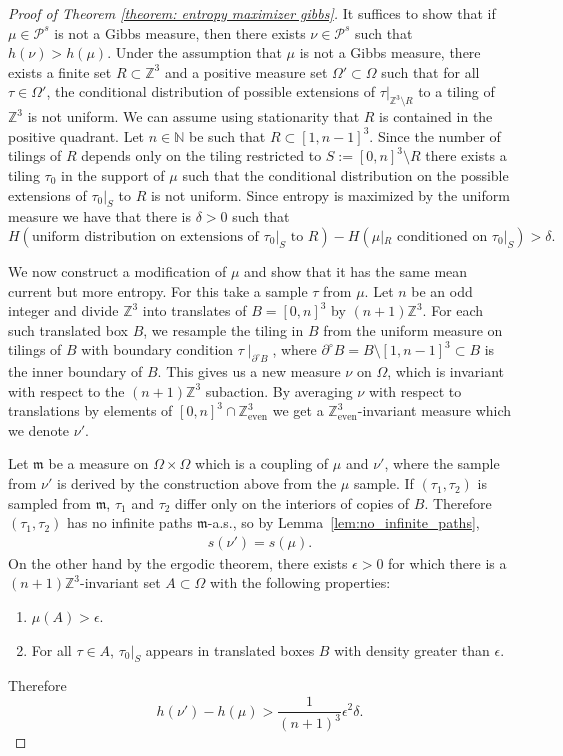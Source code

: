 \documentclass[11pt]{article}
\theoremstyle{remark}
\theoremstyle{definition}
\newcommand{\Z}{\mathbb{Z}}
\newcommand{\threeeven}{\Z^3_{\text{even}}}
\newcommand{\mc}[1]{\mathcal{#1}}
\begin{document}
\begin{proof}[Proof of Theorem \ref{theorem: entropy maximizer gibbs}]
It suffices to show that if $\mu\in \mc P^s$ is not a  Gibbs measure, then there exists $\nu\in \mc P^s$ such that $h(\nu) > h(\mu)$. Under the assumption that $\mu$ is not a Gibbs measure, there exists a finite set $R\subset \Z^3$ and a positive measure set $\Omega'\subset \Omega$ such that for all $\tau\in \Omega'$, the conditional distribution of possible extensions of $\tau|_{\Z^3\setminus R}$ to a tiling of $\Z^3$ is not uniform. We can assume using stationarity that $R$ is contained in the positive quadrant. Let $n\in \mathbb N$ be such that $R\subset[1,n-1]^3$.  Since the number of tilings of $R$ depends only on the tiling restricted to $S:=[0,n]^3\setminus R$ there exists a tiling $\tau_0$ in the support of $\mu$ such that the conditional distribution on the possible extensions of $\tau_0|_{S}$ to $R$ is not uniform. Since entropy is maximized by the uniform measure we have that there is $\delta>0$ such that
$$H(\text{uniform distribution on extensions of $\tau_0|_{S}$ to $R$})-H(\mu|_{R}\text{ conditioned on }\tau_0|_S)>\delta.$$

We now construct a modification of $\mu$ and show that it has the same mean current but more entropy. For this take a sample $\tau$ from $\mu$. Let $n$ be an odd integer and divide $\Z^3$ into translates of $B=[0,n]^3$ by $(n+1)\Z^3$. For each such translated box $B$, we resample the tiling in $B$ from the uniform measure on tilings of $B$ with boundary condition $\tau\mid_{\partial^\circ B}$, where $\partial^\circ B = B\setminus [1,n-1]^3\subset B$ is the inner boundary of $B$.
This gives us a new measure $\nu$ on $\Omega$, which is invariant with respect to the $(n+1)\Z^3$ subaction. By averaging $\nu$ with respect to translations by elements of $[0,n]^3\cap \threeeven$ we get a $\threeeven$-invariant measure which we denote $\nu'$. 

Let $\mathfrak m$ be a measure on $\Omega\times \Omega$ which is a coupling of $\mu$ and $\nu'$, where the sample from $\nu'$ is derived by the construction above from the $\mu$ sample. 
If $(\tau_1,\tau_2)$ is sampled from $\mathfrak m$, $\tau_1$ and $\tau_2$ differ only on the interiors of copies of $B$. Therefore $(\tau_1,\tau_2)$ has no infinite paths $\mathfrak m$-a.s., so by Lemma~\ref{lem:no_infinite_paths}, 
\begin{align*}
    s(\nu') = s(\mu). 
\end{align*} 
On the other hand by the ergodic theorem, there exists $\epsilon>0$ for which there is a $(n+1)\Z^3$-invariant set $A \subset \Omega$ with the following properties:
\begin{enumerate}
	\item $\mu(A)>\epsilon$.
	\item For all $\tau\in A$, $\tau_0|_S$ appears in translated boxes $B$ with density greater than $\epsilon$. 
\end{enumerate}
Therefore
$$h(\nu')-h(\mu)> \frac{1}{(n+1)^3}\epsilon^2\delta.$$
\end{proof}
\end{document}
